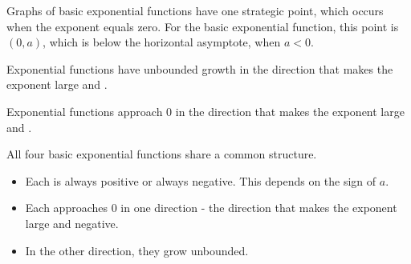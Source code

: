 \documentclass{ximera}
\begin{document}
\begin{explanation}
\begin{image}
\end{image}



Graphs of basic exponential functions have one strategic point, which occurs when the exponent equals zero. For the basic exponential function, this point is $(0, a)$, which is below the horizontal asymptote, when $a < 0$.




Exponential functions have unbounded growth in the direction that makes the exponent large and .


Exponential functions approach $0$ in the direction that makes the exponent large and .


\end{explanation}






All four basic exponential functions share a common structure.


\begin{itemize}
\item Each is always positive or always negative. This depends on the sign of $a$.
\item Each approaches $0$ in one direction - the direction that makes the exponent large and negative.
\item In the other direction, they grow unbounded. 
\end{itemize}
\end{document}
